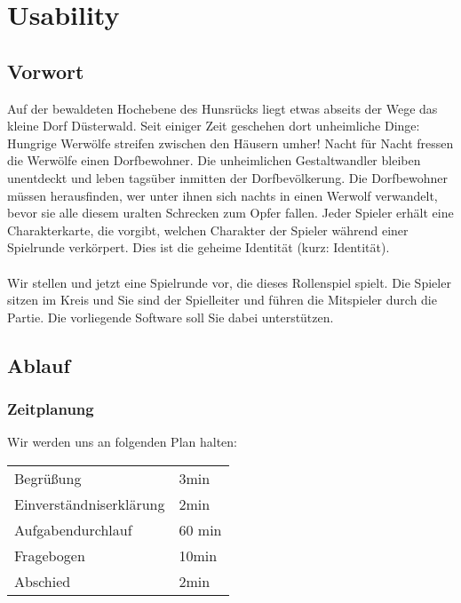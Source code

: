 \chapter{Usability}
\section{Vorwort}
Auf der bewaldeten Hochebene des Hunsrücks liegt etwas abseits der Wege das kleine Dorf Düsterwald. Seit einiger Zeit geschehen dort unheimliche Dinge: Hungrige Werwölfe streifen zwischen den Häusern umher! Nacht für Nacht fressen die Werwölfe einen Dorfbewohner. Die unheimlichen Gestaltwandler bleiben unentdeckt und leben tagsüber inmitten der Dorfbevölkerung. Die Dorfbewohner müssen herausfinden, wer unter ihnen sich nachts in einen Werwolf verwandelt, bevor sie alle diesem uralten Schrecken zum Opfer fallen. Jeder Spieler erhält eine Charakterkarte, die vorgibt, welchen Charakter der Spieler während einer Spielrunde verkörpert. Dies ist die geheime Identität (kurz: Identität). \\ ~\\ Wir stellen und jetzt eine Spielrunde vor, die dieses Rollenspiel spielt. Die Spieler sitzen im Kreis und Sie sind der Spielleiter und führen die Mitspieler durch die Partie. Die vorliegende Software soll Sie dabei unterstützen.

\section{Ablauf}    
    
\subsection{Zeitplanung}    
Wir werden uns an folgenden Plan halten:  \\
\begin{center}
\begin{tabular}{|l|l|}
  \hline
  Begrüßung & 3min \\ 
  Einverständniserklärung & 2min \\ 
  Aufgabendurchlauf & 60 min \\
  \hline \hline
  Fragebogen & 10min\\
  Abschied & 2min\\
  \hline
\end{tabular} 
\end{center}
